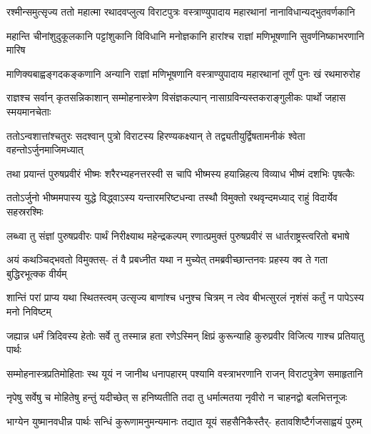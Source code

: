 \fourlineindentedshloka
{रश्मीन्समुत्सृज्य ततो महात्मा}
{रथादवप्लुत्य विराटपुत्रः}
{वस्त्राण्युपादाय महारथानां}
{नानाविधान्यद्भुतवर्णकानि}


\fourlineindentedshloka
{महान्ति चीनांशुदुकूलकानि}
{पट्टांशुकानि विविधानि मनोज्ञकानि}
{हारांश्च राज्ञां मणिभूषणानि}
{सुवर्णनिष्काभरणानि मारिष}


\fourlineindentedshloka
{माणिक्यबाह्वङ्गदकङ्कणानि}
{अन्यानि राज्ञां मणिभूषणानि}
{वस्त्राण्युपादाय महारथानां}
{तूर्णं पुनः खं रथमारुरोह}


\fourlineindentedshloka
{राज्ञश्च सर्वान् कृतसन्निकाशान्}
{सम्मोहनास्त्रेण विसंज्ञकल्पान्}
{नासाग्रविन्यस्तकराङ्गुलीकः}
{पार्थो जहास स्मयमानचेताः}


\fourlineindentedshloka
{ततोऽन्वशात्तांश्चतुरः सदश्वान्}
{पुत्रो विराटस्य हिरण्यकक्ष्यान्}
{ते तद्व्यतीयुर्द्विषतामनीकं}
{श्वेता वहन्तोऽर्जुनमाजिमध्यात्}


\fourlineindentedshloka
{तथा प्रयान्तं पुरुषप्रवीरं}
{भीष्मः शरैरभ्यहनत्तरस्वी}
{स चापि भीष्मस्य हयान्निहत्य}
{विव्याध भीष्मं दशभिः पृषत्कैः}


\fourlineindentedshloka
{ततोऽर्जुनो भीष्ममपास्य युद्धे}
{विद्ध्वाऽस्य यन्तारमरिष्टधन्वा}
{तस्थौ विमुक्तो रथवृन्दमध्याद्}
{राहुं विदार्येव सहस्ररश्मिः}


\fourlineindentedshloka
{लब्ध्वा तु संज्ञां पुरुषप्रवीरः}
{पार्थं निरीक्ष्याथ महेन्द्रकल्पम्}
{रणात्प्रमुक्तं पुरुषप्रवीरं स}
{धार्तराष्ट्रस्त्वरितो बभाषे}


\fourlineindentedshloka
{अयं कथञ्चिद्भवतो विमुक्तस्-}
{तं वै प्रबध्नीत यथा न मुच्येत्}
{तमब्रवीच्छान्तनवः प्रहस्य}
{क्व ते गता बुद्धिरभूत्क्क वीर्यम्}


\fourlineindentedshloka
{शान्तिं परां प्राप्य यथा स्थितस्त्वम्}
{उत्सृज्य बाणांश्च धनुश्च चित्रम्}
{न त्वेव बीभत्सुरलं नृशंसं}
{कर्तुं न पापेऽस्य मनो निविष्टम्}


\fourlineindentedshloka
{जह्यान्न धर्मं त्रिदिवस्य हेतोः}
{सर्वे तु तस्मान्न हता रणेऽस्मिन्}
{क्षिप्रं कुरून्याहि कुरुप्रवीर}
{विजित्य गाश्च प्रतियातु पार्थः}


\fourlineindentedshloka
{सम्मोहनास्त्रप्रतिमोहिताः स्थ}
{यूयं न जानीथ धनापहारम्}
{पश्यामि वस्त्राभरणानि राजन्}
{विराटपुत्रेण समाहृतानि}


\fourlineindentedshloka
{नृपेषु सर्वेषु च मोहितेषु}
{हन्तुं यदीच्छेत् स हनिष्यतीति}
{तदा तु धर्मात्मतया नृवीरो}
{न चाहनद्वो बलभित्तनूजः}


\fourlineindentedshloka
{भाग्येन युष्मानवधीन्न पार्थः}
{सन्धिं कुरूणामनुमन्यमानः}
{तद्यात यूयं सहसैनिकैस्तैर्-}
{हतावशिष्टैर्गजसाह्वयं पुरुम्}


